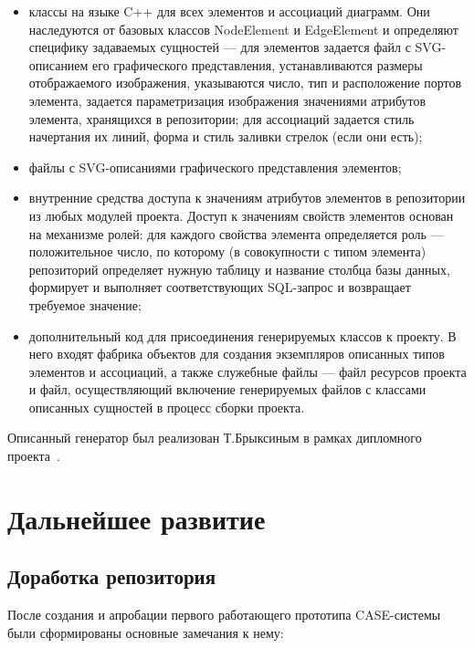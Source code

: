 \documentclass[a5paper]{article}
\begin{document}
\begin{itemize}
  \item классы на языке C++ для всех элементов и
        ассоциаций диаграмм. Они наследуются от базовых классов
        NodeElement и EdgeElement и определяют специфику
        задаваемых сущностей --- для элементов задается файл с
        SVG-описанием его графического
        представления, устанавливаются размеры отображаемого изображения,
        указываются число, тип и расположение портов элемента, задается
        параметризация изображения значениями атрибутов элемента, хранящихся в
        репозитории; для ассоциаций задается стиль начертания их линий, форма и
        стиль заливки стрелок (если они есть);
  \item файлы с SVG-описаниями графического представления элементов;
  \item внутренние средства доступа к значениям атрибутов элементов в
        репозитории из любых модулей проекта. Доступ к значениям свойств
        элементов основан на механизме ролей: для каждого свойства элемента
        определяется роль --- положительное число, по которому (в совокупности
        с типом элемента) репозиторий определяет нужную таблицу и название
        столбца базы данных, формирует и выполняет соответствующих
        SQL-запрос и возвращает требуемое значение;
  \item дополнительный код для присоединения генерируемых классов к проекту. В
        него входят фабрика объектов для создания экземпляров описанных типов
        элементов и ассоциаций, а также служебные файлы --- файл ресурсов проекта
        и файл, осуществляющий включение генерируемых файлов с классами
        описанных сущностей в процесс сборки проекта.
\end{itemize}

Описанный генератор был реализован Т.Брыксиным в рамках дипломного
проекта~\cite{bryksin}.

\section{Дальнейшее развитие}
\subsection{Доработка репозитория}

После создания и апробации первого работающего прототипа
CASE-системы были сформированы основные замечания к нему:
\end{document}
